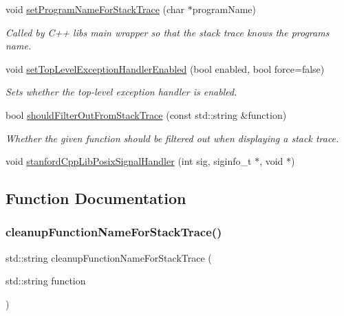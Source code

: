 \begin{DoxyCompactItemize}
void \mbox{\hyperlink{namespaceexceptions_ad0e98551ca679408334da24bdf4e4584}{set\+Program\+Name\+For\+Stack\+Trace}} (char $\ast$program\+Name)
\begin{DoxyCompactList}\small\item\em Called by C++ lib\textquotesingle{}s main wrapper so that the stack trace knows the program\textquotesingle{}s name. \end{DoxyCompactList}\item 
void \mbox{\hyperlink{namespaceexceptions_ad979db40ba52ed7b58c8b78493dcaf84}{set\+Top\+Level\+Exception\+Handler\+Enabled}} (bool enabled, bool force=false)
\begin{DoxyCompactList}\small\item\em Sets whether the top-\/level exception handler is enabled. \end{DoxyCompactList}\item 
bool \mbox{\hyperlink{namespaceexceptions_ac20de63bd41bb6c1f95bd2af4c3eaf53}{should\+Filter\+Out\+From\+Stack\+Trace}} (const std\+::string \&function)
\begin{DoxyCompactList}\small\item\em Whether the given function should be filtered out when displaying a stack trace. \end{DoxyCompactList}\item 
void \mbox{\hyperlink{namespaceexceptions_af5fc12dcfd6bf28b568340210c9cc291}{stanford\+Cpp\+Lib\+Posix\+Signal\+Handler}} (int sig, siginfo\+\_\+t $\ast$, void $\ast$)
\end{DoxyCompactItemize}


\subsection{Function Documentation}
\mbox{\label{namespaceexceptions_a5461ca18351950c6bfd41a5848e5cc21}} 
\subsubsection{\texorpdfstring{cleanup\+Function\+Name\+For\+Stack\+Trace()}{cleanupFunctionNameForStackTrace()}}
{\footnotesize\ttfamily std\+::string cleanup\+Function\+Name\+For\+Stack\+Trace (\begin{DoxyParamCaption}\item[{std\+::string}]{function }\end{DoxyParamCaption})}



